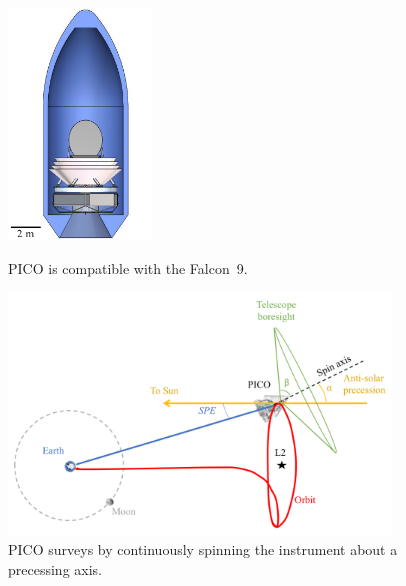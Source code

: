 \begin{figure}[!b]
  \begin{minipage}[b]{0.29\textwidth}
    \begin{center}
    \includegraphics[width=1.5in]{figures/InFairing.JPG}
\caption{\captiontext PICO is compatible with the Falcon~9.\label{fig:InFairing}}
    \end{center}
  \end{minipage}
%
\hfill
\begin{minipage}[b]{0.67\textwidth}
    \begin{center}
    \includegraphics[width=4in]{figures/MissionDesignFigure.png}
\caption{\captiontext
  PICO surveys by continuously spinning the instrument about a
  precessing axis.\label{fig:MissionDesignFigure}}
   \end{center}
  \end{minipage}
 
\end{figure}




